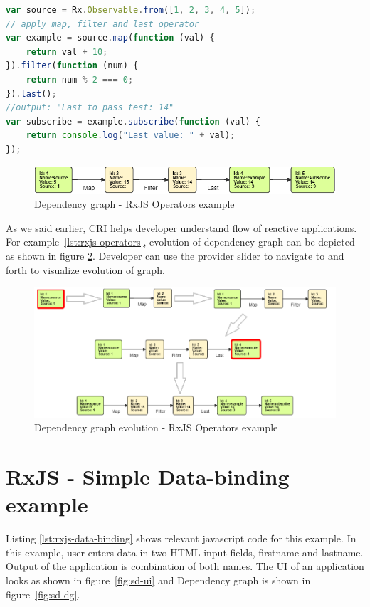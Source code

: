 \begin{lstlisting}[language=JavaScript, caption=RxJS - Operators example, label={lst:rxjs-operators}]
var source = Rx.Observable.from([1, 2, 3, 4, 5]);
// apply map, filter and last operator
var example = source.map(function (val) {
	return val + 10;
}).filter(function (num) {
	return num % 2 === 0;
}).last();
//output: "Last to pass test: 14"
var subscribe = example.subscribe(function (val) {
	return console.log("Last value: " + val);
});
\end{lstlisting}

\begin{figure}[!h]
	\centering
	\includegraphics[scale=0.7,trim=0 0 0 0]{images/RxJS-operators/final.png}
	\caption{Dependency graph - RxJS Operators example}
	\label{fig:rxjs-operators-dg}
\end{figure}

As we said earlier, CRI helps developer understand flow of reactive applications. For example~\ref{lst:rxjs-operators}, evolution of dependency graph can be depicted as shown in figure \ref{fig:rxjs-operators-dg-evolution}. Developer can use the provider slider to navigate to and forth to visualize evolution of graph.

\begin{figure}[!h]
	\centering
	\includegraphics[scale=0.7,trim=0 0 0 0]{images/RxJS-operators/steps-all.png}
	\caption{Dependency graph evolution - RxJS Operators example}
	\label{fig:rxjs-operators-dg-evolution}
\end{figure}

\section{RxJS - Simple Data-binding example}
Listing \ref{lst:rxjs-data-binding} shows relevant javascript code for this example. In this example, user enters data in two HTML input fields, firstname and lastname. Output of the application is combination of both names. The UI of an application looks as shown in figure~\ref{fig:sd-ui} and Dependency graph is shown in figure~\ref{fig:sd-dg}. 

